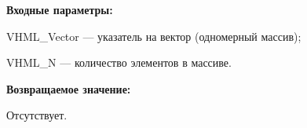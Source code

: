 \textbf{Входные параметры:}

 VHML\_Vector --- указатель на вектор (одномерный массив);
 
 VHML\_N --- количество элементов в массиве.

\textbf{Возвращаемое значение:}

Отсутствует.